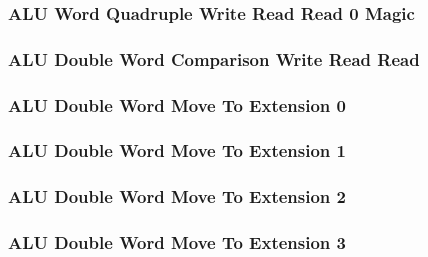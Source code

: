 \subsubsection[{\small ALU Word Quadruple Write Read Read 0 Magic}]{ALU Word Quadruple Write Read Read 0 Magic} \label{sec:format-ALU-QWRR0.M}



\subsubsection[{\small ALU Double Word Comparison Write Read Read}]{ALU Double Word Comparison Write Read Read} \label{sec:format-ALU-QCWRR}



\subsubsection[{\small ALU Double Word Move To Extension 0}]{ALU Double Word Move To Extension 0} \label{sec:format-ALU-XMOVETD0}



\subsubsection[{\small ALU Double Word Move To Extension 1}]{ALU Double Word Move To Extension 1} \label{sec:format-ALU-XMOVETD1}



\subsubsection[{\small ALU Double Word Move To Extension 2}]{ALU Double Word Move To Extension 2} \label{sec:format-ALU-XMOVETD2}



\subsubsection[{\small ALU Double Word Move To Extension 3}]{ALU Double Word Move To Extension 3} \label{sec:format-ALU-XMOVETD3}

